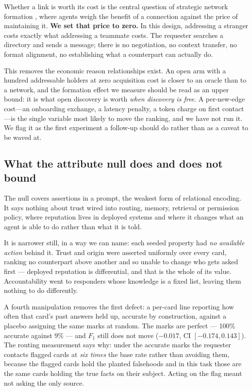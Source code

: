 Whether a link is worth its cost is the central question of strategic network formation
\cite{jackson1996}, where agents weigh the benefit of a connection against the price of
maintaining it. \textbf{We set that price to zero.} In this design, addressing a stranger
costs exactly what addressing a teammate costs.
The requester searches a directory and sends a message; there is no negotiation, no
context transfer, no format alignment, no establishing what a counterpart can actually
do.

This removes the economic reason relationships exist. An open arm with a hundred
addressable holders at zero acquisition cost is closer to an oracle than to a network,
and the formation effect we measure should be read as an upper bound: it is what open
discovery is worth \emph{when discovery is free}. A per-new-edge cost---an onboarding
exchange, a latency penalty, a token charge on first contact---is the single variable
most likely to move the ranking, and we have not run it. We flag it as the first
experiment a follow-up should do rather than as a caveat to be waved at.

\subsection{What the attribute null does and does not bound}

The null covers assertions in a prompt, the weakest form of relational encoding. It says
nothing about trust wired into routing, memory, retrieval or permission policy, where
reputation lives in deployed systems and where it changes what an agent is able to do
rather than what it is told.

It is narrower still, in a way we can name: each seeded property had \emph{no available
action} behind it. Trust and origin were asserted uniformly over every card, ranking no
counterpart above another and so unable to change who gets asked first --- deployed
reputation is differential, and that is the whole of its value. Accountability went to
responders whose knowledge is a fixed list, leaving them nothing to do differently.

A fourth manipulation removes the first defect: a per-card line reporting how often that
card's past answers held up, accurate by construction, against a placebo assigning the
same marks at random. The marks are perfect --- 100\% accurate against 9\% --- and $F_1$
still does not move ($-0.017$, CI $[-0.174, 0.143]$). The routing measurement says why:
under the accurate marks the requester contacts flagged cards at \emph{six times} the base
rate rather than avoiding them, because the flagged cards hold the planted falsehoods and
in this task those are the same cards holding the true facts on their subject. Acting on
the flag meant not asking the only source.


